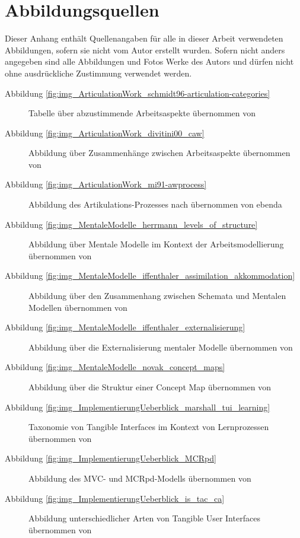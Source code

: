 \chapter*{Abbildungsquellen}

Dieser Anhang enthält Quellenangaben für alle in dieser Arbeit verwendeten Abbildungen, sofern sie nicht vom Autor erstellt wurden. Sofern nicht anders angegeben sind alle Abbildungen und Fotos Werke des Autors und dürfen nicht ohne ausdrückliche Zustimmung verwendet werden.

\begin{description}
 \item[Abbildung \ref{fig:img_ArticulationWork_schmidt96-articulation-categories}] Tabelle über abzustimmende Arbeitsaspekte übernommen von \citep{Schmidt96}
 \item[Abbildung \ref{fig:img_ArticulationWork_divitini00_caw}] Abbildung über Zusammenhänge zwischen Arbeitsaspekte übernommen von \citep{Divitini00}
 \item[Abbildung \ref{fig:img_ArticulationWork_mi91-awprocess}] Abbildung des Artikulations-Prozesses nach \citep{Mi91} übernommen von ebenda
 \item[Abbildung \ref{fig:img_MentaleModelle_herrmann_levels_of_structure}] Abbildung über Mentale Modelle im Kontext der Arbeitsmodellierung übernommen von \citep{Herrmann02}
 \item[Abbildung \ref{fig:img_MentaleModelle_iffenthaler_assimilation_akkommodation}] Abbildung über den Zusammenhang zwischen Schemata und Mentalen Modellen übernommen von \citep{Ifenthaler06}
 \item[Abbildung \ref{fig:img_MentaleModelle_iffenthaler_externalisierung}] Abbildung über die Externalisierung mentaler Modelle übernommen von \citep{Ifenthaler06}
 \item[Abbildung \ref{fig:img_MentaleModelle_novak_concept_maps}] Abbildung über die Struktur einer Concept Map übernommen von \citep{Novak06}
 \item[Abbildung \ref{fig:img_ImplementierungUeberblick_marshall_tui_learning}] Taxonomie von Tangible Interfaces im Kontext von Lernprozessen übernommen von \citep{Marshall07}
 \item[Abbildung \ref{fig:img_ImplementierungUeberblick_MCRpd}] Abbildung des MVC- und MCRpd-Modells übernommen von \citep{Ullmer00}
 \item[Abbildung \ref{fig:img_ImplementierungUeberblick_is_tac_ca} ] Abbildung unterschiedlicher Arten von Tangible User Interfaces übernommen von \citep{Ullmer05}

\end{description}
